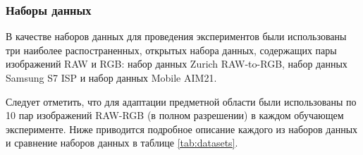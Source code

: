 \subsubsection{Наборы данных}\label{sect-2-2-2}

В качестве наборов данных для проведения экспериментов были использованы три наиболее распостраненных, открытых набора данных, содержащих пары изображений RAW и RGB: набор данных Zurich RAW-to-RGB, набор данных Samsung S7 ISP и набор данных Mobile AIM21.

Следует отметить, что для адаптации предметной области были использованы по 10 пар изображений RAW-RGB (в полном разрешении) в каждом обучающем эксперименте. Ниже приводится подробное описание каждого из наборов данных и сравнение наборов данных в таблице \ref{tab:datasets}.





